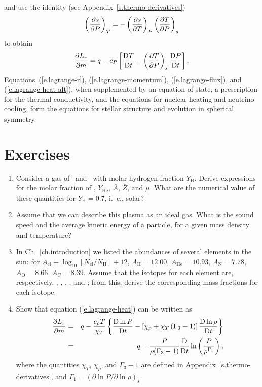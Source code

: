 and use the identity (see Appendix~\ref{s.thermo-derivatives})
\[
	\left(\frac{\partial s}{\partial P}\right)_{T} = -\left(\frac{\partial s}{\partial T}\right)_{P}\left(\frac{\partial T}{\partial P}\right)_{s}
\]
to obtain
\begin{equation}\label{e.lagrange-heat-alt}
	\frac{\partial L_{r}}{\partial m} 
	= q - c_{P}\left[ \frac{\mathrm{D} T}{\mathrm{D} t} - \left(\frac{\partial T}{\partial P}\right)_{s} \frac{\mathrm{D} P}{\mathrm{D} t}\right].
\end{equation}
Equations~(\ref{e.lagrange-r}), (\ref{e.lagrange-momentum}), (\ref{e.lagrange-flux}), and (\ref{e.lagrange-heat-alt}), when supplemented by an equation of state, a prescription for the thermal conductivity, and the equations for nuclear heating and neutrino cooling, form the equations for stellar structure and evolution in spherical symmetry. 

\section{Exercises}
\begin{enumerate}
\item Consider a gas of \hydrogen\ and \helium\ with molar hydrogen fraction $Y_{\mathrm{H}}$.  Derive expressions for the molar fraction of \helium, $Y_{\mathrm{He}}$, $\bar{A}$, $\bar{Z}$, and $\mu$. What are the numerical value of these quantities for $Y_{\mathrm{H}} = 0.7$, i.~e., solar?

\item Assume that we can describe this plasma as an ideal gas.  What is the sound speed and the average kinetic energy of a particle, for a given mass density and temperature?

\item In Ch.~\ref{ch.introduction} we listed the abundances of several elements in the sun: for $A_{\mathrm{el}} \equiv \log_{10}[N_{\mathrm{el}}/N_{\mathrm{H}}]+12$, $A_{\mathrm{H}} = 12.00$, $A_{\mathrm{He}} = 10.93$, $A_{\mathrm{N}}=7.78$, $A_{\mathrm{O}}=8.66$, $A_{\mathrm{C}} = 8.39$.  Assume that the isotopes for each element are, respectively, \hydrogen, \helium, \nitrogen, \oxygen, and \carbon; from this, derive the corresponding mass fractions for each isotope.

\item\label{p.lagrange-heat} Show that equation (\ref{e.lagrange-heat}) can be written as
\begin{eqnarray}
\frac{\partial L_{r}}{\partial m} &=& q - \frac{c_{\rho} T}{\chi_{T}}\left\{\frac{\mathrm{D}\ln P}{\mathrm{D} t} - \left[\chi_{\rho} + \chi_{T}\left(\Gamma_{3} - 1\right)\right]\frac{\mathrm{D}\ln \rho}{\mathrm{D} t}\right\}\\
 &=& q - \frac{P}{\rho(\Gamma_{3}-1)}\frac{\mathrm{D} }{\mathrm{D} t}\ln\left(\frac{P}{\rho^{\Gamma_{1}}}\right),
\label{e.lagrange-heat-alt2}
\end{eqnarray}
where the quantities $\chi_{T}$, $\chi_{\rho}$, and $\Gamma_{3}-1$ are defined in Appendix~\ref{s.thermo-derivatives}, and $\Gamma_{1} = (\partial \ln P/\partial\ln \rho)_{s}$. 
\end{enumerate}

